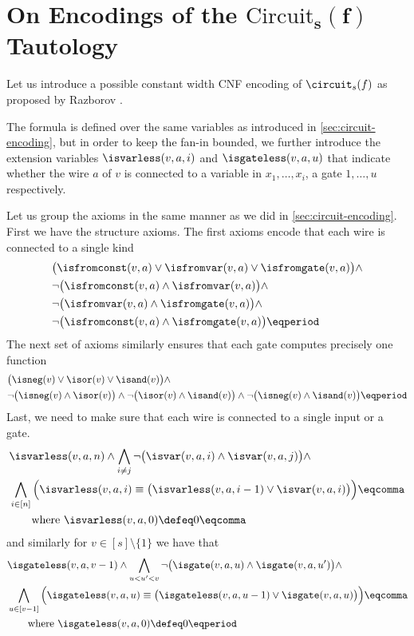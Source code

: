 \section[On Encodings of the $\circuit_s(f)$ Tautology]{On Encodings
  of the $\bm{\mathrm{Circuit}_s(f)}$ Tautology}
\label{sec:encoding}

Let us introduce a possible constant width CNF encoding of
$\circuit_s(f)$ as proposed by Razborov \cite{Razborov98}.

The formula is defined over the same variables as introduced in
\cref{sec:circuit-encoding}, but in order to keep the fan-in bounded,
we further introduce the extension variables $\isvarless(v, a, i)$ and
$\isgateless(v, a, u)$ that indicate whether the wire $a$ of $v$ is
connected to a variable in $x_1, \ldots, x_i$, a gate $1, \ldots, u$
respectively.

Let us group the axioms in the same manner as we did in
\cref{sec:circuit-encoding}. First we have the structure axioms. The
first axioms encode that each wire is connected to a single kind
\begin{align}
  &\big(\isfromconst(v, a) \vee \isfromvar(v, a) \vee \isfromgate(v,
    a)\big) \wedge \nonumber\\
  &\neg\big(\isfromconst(v, a) \wedge \isfromvar(v, a)\big) \wedge\nonumber\\
  &\neg\big(\isfromvar(v, a) \wedge \isfromgate(v, a)\big) \wedge\nonumber\\
  &\neg\big(\isfromconst(v, a) \wedge \isfromgate(v, a)\big) \eqperiod
\end{align}
The next set of axioms similarly ensures that each gate computes
precisely one function
\begin{align}
  &\big(\isneg(v) \vee \isor(v) \vee \isand(v)\big) \land\nonumber\\
  &\neg\big(\isneg(v) \wedge \isor(v)\big) \wedge \neg\big(\isor(v) \wedge
    \isand(v)\big) \wedge \neg\big(\isneg(v) \wedge \isand(v)\big) \eqperiod
\end{align}
Last, we need to make sure that each wire is connected to a single
input or a gate.
\begin{align}
  \label{ax:input-cnf}
  &\isvarless(v, a, n) \wedge \bigwedge_{i \neq j}\neg \big(\isvar(v,a,i) \wedge
    \isvar(v,a,j)\big) \wedge\nonumber\\
    &\bigwedge_{i \in [n]}
      \Big(\isvarless(v, a, i) \equiv
    \big(\isvarless(v, a, i-1) \vee \isvar(v, a, i)\big)
    \Big) \eqcomma \nonumber\\
  &\qquad\text{where } \isvarless(v, a, 0) \defeq 0 \eqcomma
\end{align}
and similarly for $v \in [s] \setminus \{1\}$ we have that 
\begin{align}
  \label{ax:gate-cnf}
  &\isgateless(v, a, v-1) \wedge
    \bigwedge_{u < u' < v} \neg\big(\isgate(v,a,u) \wedge \isgate(v,a,u')\big)
    \wedge\nonumber\\
  &\bigwedge_{u \in [v-1]}
    \Big(
    \isgateless(v, a, u) \equiv
    \big(\isgateless(v, a, u-1) \vee \isgate(v, a, u)\big)
    \Big)\eqcomma \nonumber\\
  &\qquad\text{where }\isgateless(v, a, 0) \defeq 0 \eqperiod
\end{align}


